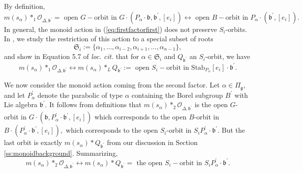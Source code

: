 \documentclass[12pt]{amsart}
\numberwithin{equation}{section}
\newcommand{\fg}{\mbox{${\mathfrak g}$}}
\newcommand{\fb}{\mbox{${\mathfrak b}$}}
\newcommand{\ms}{m(s_{\alpha})}
\begin{document}
By definition,
\begin{equation}\label{eq:firstfactorfirst}
\ms*_{1} \mathcal{O}_{\Delta,\fb^{\prime}}=\mbox{ open } G-\mbox{orbit in } G\cdot (P_{\alpha}\cdot\fb, \fb^{\prime}, [e_{i}])\longleftrightarrow \mbox{ open } B-\mbox{orbit in } P_{\alpha}\cdot (\fb^{\prime}, [e_{i}]).
\end{equation}
In general, the monoid action in (\ref{eq:firstfactorfirst}) does not preserve $S_{i}$-orbits.  In \cite{Siorbits}, we study the restriction of this action to a special subset of roots
\begin{equation}\label{eq:extraroots}
\mathfrak{S}_i:=\{\alpha_{1},\dots, \alpha_{i-2},\alpha_{i+1},\dots, \alpha_{n-1}\},
\end{equation}
and show in Equation 5.7 of \emph{loc. cit.} that for $\alpha\in \mathfrak{S}_i$ and $Q_{\fb^{\prime}}$ an $S_{i}$-orbit, we have 
\begin{equation}\label{eq:leftmonoidSi}
\ms*_{1} \mathcal{O}_{\Delta,\fb^{\prime}}\longleftrightarrow \ms*_{L}Q_{\fb^{\prime}}:=\mbox{ open } S_{i}-\mbox{orbit in } \mbox{Stab}_{P_{\alpha}}[e_{i}] \cdot\fb^{\prime}.
\end{equation}

We now consider the monoid action coming from the second factor. Let $\alpha\in\Pi_{\fg}$, and let $P_{\alpha}^{\prime}$ denote the parabolic of type $\alpha$ containing the Borel subgroup $B^{\prime}$ with Lie algebra $\fb^{\prime}.$ It follows from definitions that $\ms*_{2} \mathcal{O}_{\Delta,\fb^{\prime}}$ is the open $G$- orbit in  $G\cdot (\fb, P_{\alpha}^{\prime}\cdot \fb^{\prime}, [e_{i}])$ which corresponds to the open $B$-orbit in
$B\cdot (P_{\alpha}^{\prime}\cdot\fb^{\prime}, [e_{i}]),$ which corresponds to the open $S_i$-orbit in $S_{i}P_{\alpha}^{\prime}\cdot\fb^{\prime}.$
But the last orbit is exactly $\ms*Q_{\fb^{\prime}}$ from our discussion in Section \ref{ss:monoidbackground}.  
Summarizing, 
\begin{equation}\label{eq:secondfactormonoid}
\ms*_{2} \mathcal{O}_{\Delta,\fb^{\prime}}\longleftrightarrow \ms* Q_{\fb^{\prime}}=  \mbox{ the open } S_{i}-\mbox{orbit in } S_{i}P_{\alpha}^{\prime}\cdot\fb^{\prime}.
\end{equation}
\end{document}
